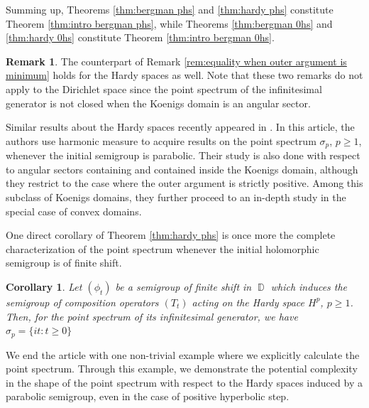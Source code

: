 \documentclass[11pt]{amsart}
\numberwithin{equation}{section}
\newtheorem{corollary}[theorem]{Corollary}
\theoremstyle{definition}
\newtheorem{remark}[theorem]{Remark}
\DeclareMathOperator{\D}{\mathbb{D}}
\begin{document}
	Summing up, Theorems \ref{thm:bergman phs} and \ref{thm:hardy phs} constitute Theorem \ref{thm:intro bergman phs}, while Theorems \ref{thm:bergman 0hs} and \ref{thm:hardy 0hs} constitute Theorem \ref{thm:intro bergman 0hs}.
	
	\begin{remark}The counterpart of Remark \ref{rem:equality when outer argument is minimum} holds for the Hardy spaces as well. Note that these two remarks do not apply to the Dirichlet space since the point spectrum of the infinitesimal generator is not closed when the Koenigs domain is an angular sector.
	\end{remark}
	
	Similar results about the Hardy spaces recently appeared in \cite{carlos-javi}. In this article, the authors use harmonic measure to acquire results on the point spectrum $\sigma_p$, $p\ge1$, whenever the initial semigroup is parabolic. Their study is also done with respect to angular sectors containing and contained inside the Koenigs domain, although they restrict to the case where the outer argument is strictly positive. Among this subclass of Koenigs domains, they further proceed to an in-depth study in the special case of convex domains.
	
	One direct corollary of Theorem \ref{thm:hardy phs} is once more the complete characterization of the point spectrum whenever the initial holomorphic semigroup is of finite shift.
	
	\begin{corollary}\label{cor:hardy finite shift}
		Let $(\phi_t)$ be a semigroup of finite shift in $\D$ which induces the semigroup of composition operators $(T_t)$ acting on the Hardy space $H^p$, $p\ge1$. Then, for the point spectrum of its infinitesimal generator, we have $\sigma_p=\{it:t\ge0\}$
	\end{corollary}
	
	We end the article with one non-trivial example where we explicitly calculate the point spectrum. Through this example, we demonstrate the potential complexity in the shape of the point spectrum with respect to the Hardy spaces induced by a parabolic semigroup, even in the case of positive hyperbolic step.
	
\end{document}
